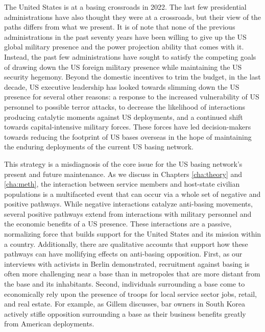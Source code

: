 The United States is at a basing crossroads in 2022. The last few presidential administrations have also thought they were at a crossroads, but their view of the paths differs from what we present. It is of note that none of the previous administrations in the past seventy years have been willing to give up the US global military presence and the power projection ability that comes with it. Instead, the past few administrations have sought to satisfy the competing goals of drawing down the US foreign military presence while maintaining the US security hegemony. Beyond the domestic incentives to trim the budget, in the last decade, US executive leadership has looked towards slimming down the US presence for several other reasons: a response to the increased vulnerability of US personnel to possible terror attacks, to decrease the likelihood of interactions producing catalytic moments against US deployments, and a continued shift towards capital-intensive military forces.\cite{Woody2021} These forces have led decision-makers towards reducing the footprint of US bases overseas in the hope of maintaining the enduring deployments of the current US basing network. 

This strategy is a misdiagnosis of the core issue for the US basing network's present and future maintenance. As we discuss in Chapters \ref{cha:theory} and \ref{cha:meth}, the interaction between service members and host-state civilian populations is a multifaceted event that can occur via a whole set of negative and positive pathways. While negative interactions catalyze anti-basing movements, several positive pathways extend from interactions with military personnel and the economic benefits of a US presence. These interactions are a passive, normalizing force that builds support for the United States and its mission within a country. Additionally, there are qualitative accounts that support how these pathways can have mollifying effects on anti-basing opposition. First, as our interviews with activists in Berlin demonstrated, recruitment against basing is often more challenging near a base than in metropoles that are more distant from the base and its inhabitants. Second, individuals surrounding a base come to economically rely upon the presence of troops for local service sector jobs, retail, and real estate. For example, as Gillem discusses, bar owners in South Korea actively stifle opposition surrounding a base as their business benefits greatly from American deployments.\cite[][To be clear, Gillem mentions this civilian support not as a positive outcome but as another facet of the oppressive nature of bases. Still, it is an example of varying preferences towards deployments and bases from the part of civilians.]{Gillem2007}

